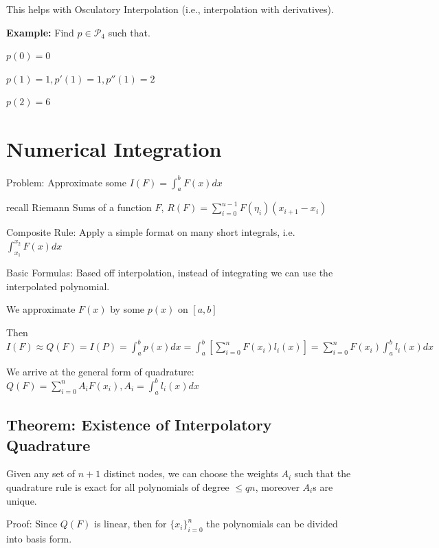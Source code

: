 \documentclass{article}
\begin{document}
This helps with Osculatory Interpolation (i.e., interpolation with derivatives).

\pagebreak

\textbf{Example:} Find $p \in \mathcal{P}_4$ such that. 

$p(0) = 0$

$p(1) = 1, p'(1) = 1, p''(1) = 2$

$p(2) = 6$

\pagebreak

\text{}

\section{Numerical Integration}

Problem: Approximate some $I(F) = \displaystyle \int_a^b F(x) dx$

recall Riemann Sums of a function $F$, $R(F) = \displaystyle \sum_{i = 0}^{u - 1} F(\eta_i)(x_{i + 1} - x_i)$

Composite Rule: Apply a simple format on many short integrals, i.e. $\displaystyle \int_{x_1}^{x_2} F(x) dx$

\vspace{0.2cm}

Basic Formulas: Based off interpolation, instead of integrating we can use the interpolated polynomial.

We approximate $F(x)$ by some $p(x)$ on $[a, b]$

Then $I(F) \approx Q(F) = I(P) = \displaystyle \int_a^b p(x) dx = \int_a^b [ \sum_{i = 0}^n F(x_i) l_i(x)] = \sum_{i =0}^n F(x_i) \int_a^b l_i(x) dx$

We arrive at the general form of quadrature: $Q(F) = \displaystyle \sum_{i = 0}^n A_i F(x_i), A_i = \displaystyle \int_a^b l_i(x) dx$ 


\vspace{0.cm}

\subsection{Theorem: Existence of Interpolatory Quadrature}

Given any set of $n + 1$ distinct nodes, we can choose the weights $A_i$ such that the quadrature rule is exact for all polynomials of degree $\le q n$, moreover $A_i$s are unique.

Proof: Since $Q(F)$ is linear, then for $\{ x_i \}_{i = 0}^n$ the polynomials can be divided into  basis form.
\end{document}
